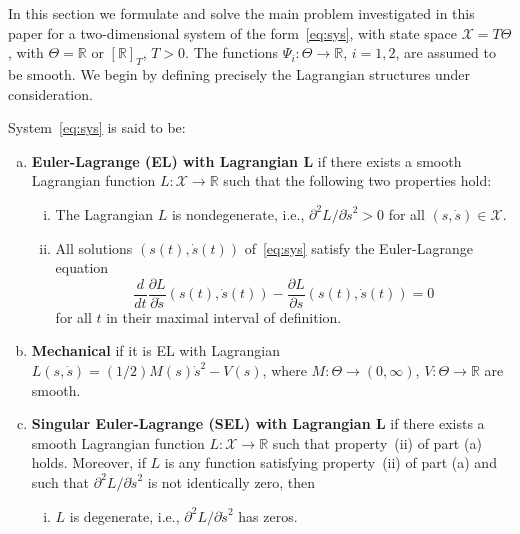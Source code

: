 In this section we formulate and solve the main problem investigated
in this paper for a two-dimensional system of the form~\eqref{eq:sys},
with state space $\mathcal{X} = T\Theta$, with $\Theta = \mathbb{R}$ or $[\mathbb{R}]_T$,
$T>0$. The functions $\Psi_i : \Theta \to \mathbb{R}$, $i=1,2$, are assumed
to be smooth. We begin by defining precisely the Lagrangian structures
under consideration.
\begin{definition}\label{def:EL} 
	System~\eqref{eq:sys} is said to be:
	
	\begin{enumerate}[(a)]
		
		\item {\bf Euler-Lagrange (EL) with Lagrangian $\mathbf{L}$} if there
		exists a smooth Lagrangian function $L: \mathcal{X} \to \mathbb{R}$ such that the
		following two properties hold:
								\begin{enumerate}[(i)]
			
			\item The Lagrangian $L$ is nondegenerate, i.e., $ \partial^2 L /
			\partial \dot s^2 >0$ for all $(s,\dot s) \in \mathcal{X}$.
			
			\item All solutions $(s(t),\dot s(t))$ of~\eqref{eq:sys} satisfy the
			Euler-Lagrange equation
												\begin{equation}\label{eq:EL}
			\frac{d}{dt} \frac{\partial L}{\partial \dot s}(s(t),\dot s(t)) -
			\frac{\partial L}{\partial s}(s(t),\dot s(t)) =0
			\end{equation}
												for all $t$ in their maximal interval of definition. 
		\end{enumerate}
								
		\item {\bf Mechanical} if it is EL with Lagrangian $L(s,\dot s) =
		(1/2) M(s) \dot s^2 - V(s)$, where $M : \Theta\to (0,\infty)$, $V
		:\Theta \to \mathbb{R}$ are smooth.
		
		\item {\bf Singular Euler-Lagrange (SEL) with Lagrangian $\mathbf{L}$}
		if there exists a smooth Lagrangian function $L: \mathcal{X} \to \mathbb{R}$ such
		that property~(ii) of part (a) holds. Moreover, if $L$ is any
		function satisfying property~(ii) of part (a) and such that $\partial^2 L / \partial
		\dot s^2$ is not identically zero, then
				\begin{enumerate}[(i)$'$]
			
			\item $L$ is degenerate, i.e., $\partial^2 L / \partial \dot s^2$
			has zeros.
		\end{enumerate}
			\end{enumerate}
\end{definition}
